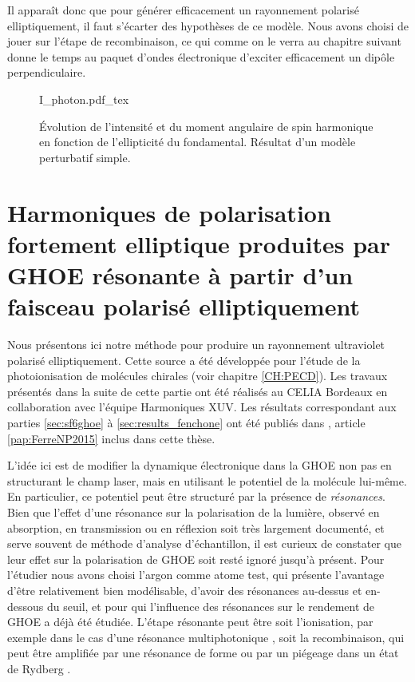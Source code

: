 Il apparaît donc que pour générer efficacement un rayonnement polarisé elliptiquement, il faut s'écarter des hypothèses de ce modèle. Nous avons choisi de jouer sur l'étape de recombinaison, ce qui comme on le verra au chapitre suivant donne le temps au paquet d'ondes électronique d'exciter efficacement un dipôle perpendiculaire. 

\begin{figure}[!ht]
\centering
\def\svgwidth{1\columnwidth}
{I_photon.pdf_tex}
\caption{\'Evolution de l'intensité et du moment angulaire de spin harmonique en fonction de l'ellipticité du fondamental. Résultat d'un modèle perturbatif simple.}
\label{fig:mas_photon}
\end{figure}

\chapter[Harmoniques de polarisation fortement elliptique produites par GHOE résonante]{Harmoniques de polarisation fortement elliptique produites par GHOE résonante à partir d'un faisceau polarisé elliptiquement}
\label{CH:Circular_HHG}
Nous présentons ici notre méthode pour produire un rayonnement ultraviolet polarisé elliptiquement. Cette source a été développée pour l'étude de la photoionisation de molécules chirales (voir chapitre \ref{CH:PECD}). Les travaux présentés dans la suite de cette partie ont été réalisés au CELIA Bordeaux en collaboration avec l'équipe Harmoniques XUV. Les résultats correspondant aux parties \ref{sec:sf6ghoe} à \ref{sec:results_fenchone} ont été publiés dans , article \ref{pap:FerreNP2015} inclus dans cette thèse.

L'idée ici est de modifier la dynamique électronique dans la GHOE non pas en structurant le champ laser, mais en utilisant le potentiel de la molécule lui-même. En particulier, ce potentiel peut être structuré par la présence de \textit{résonances}. Bien que l'effet d'une résonance sur la polarisation de la lumière, observé en absorption, en transmission ou en réflexion soit très largement documenté, et serve souvent de méthode d'analyse d'échantillon, il est curieux de constater que leur effet sur la polarisation de GHOE soit resté ignoré jusqu'à présent. Pour l'étudier nous avons choisi l'argon comme atome test, qui présente l'avantage d'être relativement bien modélisable, d'avoir des résonances au-dessus et en-dessous du seuil, et pour qui l'influence des résonances sur le rendement de GHOE a déjà été étudiée. L'étape résonante peut être soit l'ionisation, par exemple dans le cas d'une résonance multiphotonique , soit la recombinaison, qui peut être amplifiée par une résonance de forme ou par un piégeage dans un état de Rydberg .

